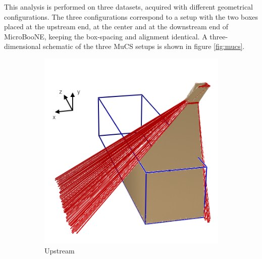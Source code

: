 \documentclass[a4paper,11pt]{article}
\begin{document}
This analysis is performed on three datasets, acquired with different geometrical configurations. The three configurations correspond to a setup with the two boxes placed at the upstream end, at the center and at the downstream end of MicroBooNE, keeping the box-spacing and alignment identical.
A three-dimensional schematic of the three MuCS setups is shown in figure \ref{fig:mucs}.

\begin{figure}[htbp]
  \begin{subfigure}{0.30\textwidth}
    \includegraphics[width=\linewidth]{figures/upstream.png}
    \caption{Upstream} \label{fig:upstream}
  \end{subfigure}
  \begin{subfigure}{0.30\textwidth}

\end{subfigure}
\end{figure}
\end{document}
